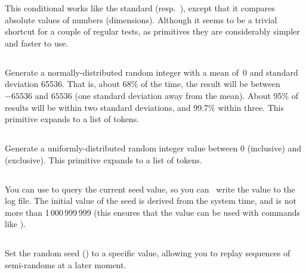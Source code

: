 \documentclass{pdftexmanual}
\begin{document}
This conditional works like the standard  (resp.\ ),
except that it compares absolute values of numbers (dimensions).
Although it seems to be a trivial shortcut for a couple of regular
 tests, as primitives they are considerably simpler and faster to
use. 

\subsection{}

Generate a normally-distributed random integer with a mean of~0 and
standard deviation 65536. That is, about 68\% of the time, the result
will be between $-65536$ and $65536$ (one standard deviation away from
the mean). About 95\% of results will be within two standard deviations,
and 99.7\% within three. This primitive expands to a list of tokens.

\subsection{}

Generate a uniformly-distributed random integer value between 0
(inclusive) and  (exclusive). This primitive expands
to a list of tokens. 

\subsection{}

You can use  to query the current seed value, so you
can \eg\ write the value to the log file. The initial value of the seed
is derived from the system time, and is not more than 1\,000\,999\,999
(this ensures that the value can be used with commands like ).

\subsection{}

Set the random seed () to a specific value,
allowing you to replay sequences of semi-randoms at a later moment.
\end{document}
